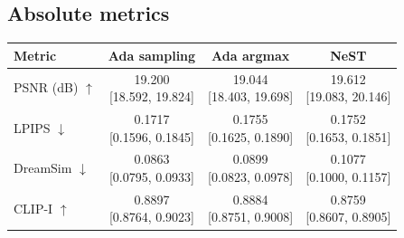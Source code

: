 \documentclass[11pt,letterpaper]{article}
\begin{document}
\subsection*{Absolute metrics}
\begin{center}\small\setlength{\tabcolsep}{12pt}\renewcommand{\arraystretch}{1.55}
\begin{tabular}{lccc}
\toprule
Metric & Ada sampling & Ada argmax & NeST\\\midrule
PSNR (dB) $\uparrow$ & \shortstack{19.200\\{}[18.592, 19.824]} & \shortstack{19.044\\{}[18.403, 19.698]} & \shortstack{19.612\\{}[19.083, 20.146]}\\
LPIPS $\downarrow$ & \shortstack{0.1717\\{}[0.1596, 0.1845]} & \shortstack{0.1755\\{}[0.1625, 0.1890]} & \shortstack{0.1752\\{}[0.1653, 0.1851]}\\
DreamSim $\downarrow$ & \shortstack{0.0863\\{}[0.0795, 0.0933]} & \shortstack{0.0899\\{}[0.0823, 0.0978]} & \shortstack{0.1077\\{}[0.1000, 0.1157]}\\
CLIP-I $\uparrow$ & \shortstack{0.8897\\{}[0.8764, 0.9023]} & \shortstack{0.8884\\{}[0.8751, 0.9008]} & \shortstack{0.8759\\{}[0.8607, 0.8905]}\\
\bottomrule\end{tabular}\end{center}
\end{document}
